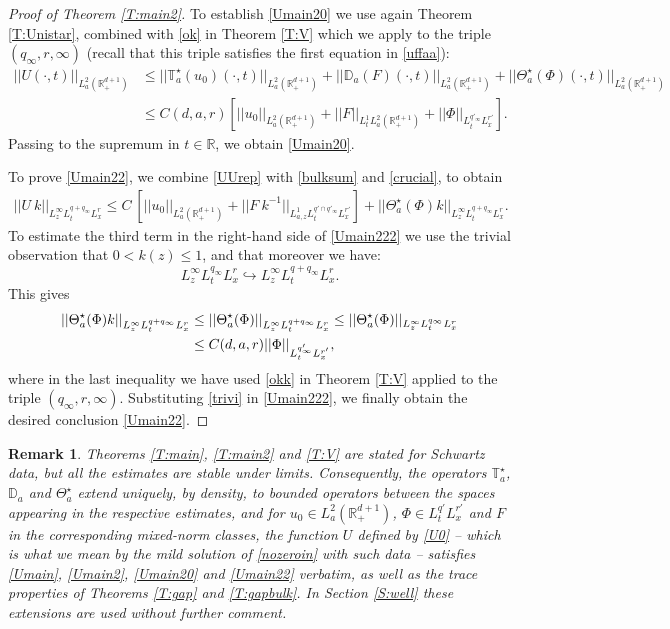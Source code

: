 \documentclass[11pt,letter]{amsart}
\def \RN {\mathbb{R}_+^{d+1}}
\def \R {\mathbb{R}}
\numberwithin{equation}{section}
\newtheorem{remark}[theorem]{Remark}
\numberwithin{equation}{section}
\begin{document}
\begin{proof}[Proof of Theorem \ref{T:main2}] To establish \eqref{Umain20} we use again Theorem \ref{T:Unistar}, combined with \eqref{ok} in Theorem \ref{T:V} which we apply to the triple $(q_\infty,r,\infty)$ (recall that this triple satisfies the first equation in \eqref{uffaa}): 
\begin{align*}
||U(\cdot,t)||_{L^2_a(\RN)} & \le ||\mathbb T^\star_a(u_0)(\cdot,t)||_{L^2_a(\RN)} + ||\mathbb D_a(F)(\cdot,t)||_{L^2_a(\RN)} + ||\Theta^\star_a(\Phi)(\cdot,t)||_{L^2_a(\RN)}
\\
& \le C(d,a,r)\left[||u_0||_{L^2_a(\RN)} + ||F||_{L^1_t L^2_a(\RN)} + ||\Phi||_{L^{q'_\infty}_t L^{r'}_x}\right].
\end{align*}
Passing to the supremum in $t\in \R$, we obtain \eqref{Umain20}.

To prove \eqref{Umain22}, we combine \eqref{UUrep} with \eqref{bulksum} and \eqref{crucial}, to obtain
\begin{align}\label{Umain222}
||U\ k||_{L^\infty_z L^{q+q_\infty}_t L^r_x } \le C\ \left[||u_0||_{L^2_a(\RN)} +  ||F \ k^{-1}||_{L^1_{a,z} L^{q'\cap q'_\infty}_t L^{r'}_x }\right] + ||\Theta^\star_a(\Phi) k||_{L^\infty_z L^{q+q_\infty}_t L^r_x }  .
\end{align}
To estimate the third term in the right-hand side of \eqref{Umain222} we use the trivial observation that $0<k(z)\le 1$, and that moreover we have:
\[
L^\infty_z L^{q_\infty}_t L^r_x  \hookrightarrow L^\infty_z L^{q+q_\infty}_t L^r_x.
\]
This gives 
\begin{align}\label{trivi}
||\Theta^\star_a(\Phi) k||_{L^\infty_z L^{q+q_\infty}_t L^r_x } & \le ||\Theta^\star_a(\Phi)||_{L^\infty_z L^{q+q_\infty}_t L^r_x } \le ||\Theta^\star_a(\Phi)||_{L^\infty_z L^{q_\infty}_t L^r_x}
\\
& \le C(d,a,r) ||\Phi||_{L^{q'_\infty}_t L^{r'}_x},
\notag
\end{align}
where in the last inequality we have used \eqref{okk} in Theorem \ref{T:V} applied to the triple $(q_\infty,r,\infty)$. Substituting \eqref{trivi} in \eqref{Umain222}, we finally obtain the desired conclusion \eqref{Umain22}.

\end{proof}

\begin{remark}\label{R:density}
Theorems \ref{T:main}, \ref{T:main2} and \ref{T:V} are stated for Schwartz data, but all the estimates are stable under limits. Consequently, the operators $\mathbb T^\star_a$, $\mathbb D_a$ and $\Theta^\star_a$ extend uniquely, by density, to bounded operators between the spaces appearing in the respective estimates, and for $u_0\in L^2_a(\RN)$, $\Phi\in L^{q'}_tL^{r'}_x$ and $F$ in the corresponding mixed-norm classes, the function $U$ defined by \eqref{U0} -- which is what we mean by the \emph{mild solution} of \eqref{nozeroin} with such data -- satisfies \eqref{Umain}, \eqref{Umain2}, \eqref{Umain20} and \eqref{Umain22} verbatim, as well as the trace properties of Theorems \ref{T:gap} and \ref{T:gapbulk}. In Section \ref{S:well} these extensions are used without further comment.
\end{remark}
\vskip 0.3in
\end{document}
